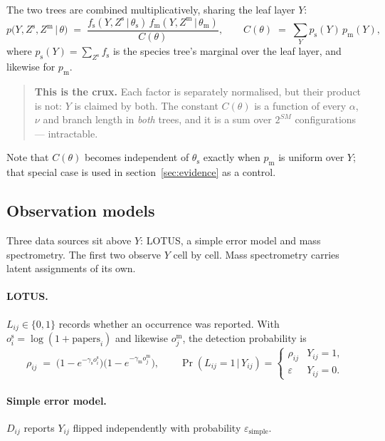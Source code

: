 \documentclass[11pt,a4paper]{article}
\newcommand{\Ys}{Y}
\newcommand{\Zs}{Z^{\mathrm{s}}}
\newcommand{\Zm}{Z^{\mathrm{m}}}
\newcommand{\fs}{f_{\mathrm{s}}}
\newcommand{\fm}{f_{\mathrm{m}}}
\newcommand{\given}{\,\vert\,}
\begin{document}
The two trees are combined multiplicatively, sharing the leaf layer $\Ys$:
\begin{equation}
  p\bigl(\Ys, \Zs, \Zm \given \theta\bigr)
  \;=\;
  \frac{\fs(\Ys, \Zs \given \theta_{\mathrm{s}})\,
        \fm(\Ys, \Zm \given \theta_{\mathrm{m}})}
       {C(\theta)},
  \qquad
  C(\theta) \;=\; \sum_{\Ys} p_{\mathrm{s}}(\Ys)\, p_{\mathrm{m}}(\Ys),
  \label{eq:joint}
\end{equation}
where $p_{\mathrm{s}}(\Ys) = \sum_{\Zs} \fs$ is the species tree's marginal over the leaf
layer, and likewise for $p_{\mathrm{m}}$.

\begin{quote}
\textbf{This is the crux.} Each factor is separately normalised, but their product is not:
$\Ys$ is claimed by both. The constant $C(\theta)$ is a function of every
$\alpha$, $\nu$ and branch length in \emph{both} trees, and it is a sum over $2^{SM}$
configurations --- intractable.
\end{quote}

Note that $C(\theta)$ becomes independent of $\theta_{\mathrm{s}}$ exactly when
$p_{\mathrm{m}}$ is uniform over $\Ys$; that special case is used in
section~\ref{sec:evidence} as a control.

\subsection{Observation models}

Three data sources sit above $\Ys$: LOTUS, a simple error model and mass spectrometry. The first
two observe $\Ys$ cell by cell. Mass spectrometry carries latent assignments of its own.

\paragraph{LOTUS.} $L_{ij} \in \{0,1\}$ records whether an occurrence was reported. With
$o^{\mathrm{s}}_i = \log(1 + \text{papers}_i)$ and likewise $o^{\mathrm{m}}_j$, the
detection probability is
\[
  \rho_{ij} \;=\; \bigl(1 - e^{-\gamma_{\mathrm{s}} o^{\mathrm{s}}_i}\bigr)
                  \bigl(1 - e^{-\gamma_{\mathrm{m}} o^{\mathrm{m}}_j}\bigr),
  \qquad
  \Pr(L_{ij}=1 \given \Ys_{ij}) =
  \begin{cases}
    \rho_{ij} & \Ys_{ij} = 1,\\
    \varepsilon & \Ys_{ij} = 0 .
  \end{cases}
\]

\paragraph{Simple error model.} $D_{ij}$ reports $\Ys_{ij}$ flipped independently with
probability $\varepsilon_{\mathrm{simple}}$.
\end{document}
